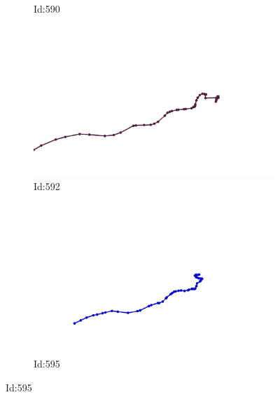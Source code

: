 \documentclass[12pt,twoside]{report}
\begin{document}
\begin{figure}
\begin{subfigure}[b]{0.20\textwidth}
\caption{Id:590}
\end{subfigure}
\begin{subfigure}[b]{0.20\textwidth}
\centering
\includegraphics[width=\textwidth]{../trajectories/592.png}
\caption{Id:592}
\end{subfigure}
\begin{subfigure}[b]{0.20\textwidth}
\centering
\includegraphics[width=\textwidth]{../trajectories/595.png}
\caption{Id:595}
\end{subfigure}
\end{figure}
\end{document}
